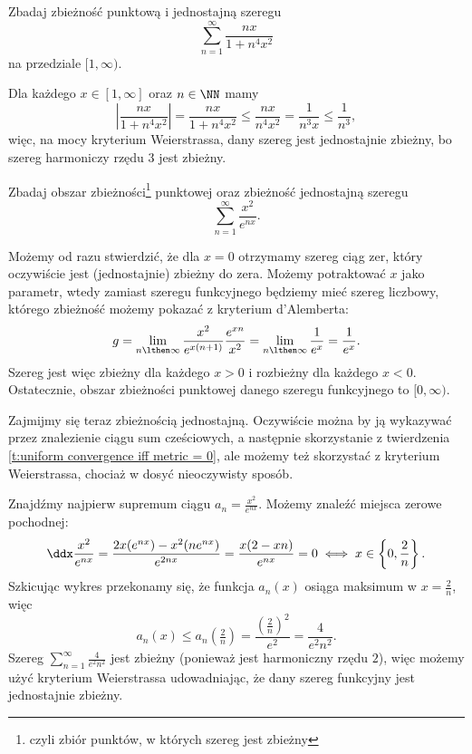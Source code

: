 \begin{example}
    Zbadaj zbieżność punktową i jednostajną szeregu
    \[ \sum_{n=1}^\infty \frac{nx}{1+n^4x^2} \]
    na przedziale $[1,\infty)$.
\end{example}
\begin{solution}
    Dla każdego $x \in [1, \infty]$ oraz $n \in \NN$ mamy
    \[ \left|\frac{nx}{1+n^4x^2}\right| = \frac{nx}{1+n^4x^2} \leq \frac{nx}{n^4x^2} = \frac{1}{n^3x} \leq \frac{1}{n^3}, \]
    więc, na mocy kryterium Weierstrassa, dany szereg jest jednostajnie zbieżny, bo szereg harmoniczy rzędu $3$ jest zbieżny.
\end{solution}

\begin{example}
    Zbadaj obszar zbieżności\footnote{czyli zbiór punktów, w których szereg jest zbieżny} punktowej oraz zbieżność jednostajną szeregu
    \[ \sum_{n=1}^\infty \frac{x^2}{e^{nx}}. \]
\end{example}
\begin{solution}
    Możemy od razu stwierdzić, że dla $x = 0$ otrzymamy szereg ciąg zer, który oczywiście jest (jednostajnie) zbieżny do zera. Możemy potraktować $x$ jako parametr, wtedy zamiast szeregu funkcyjnego będziemy mieć szereg liczbowy, którego zbieżność możemy pokazać z kryterium d'Alemberta:
    \[ g = \lim_{n\lthen\infty} \frac{x^2}{e^{x(n+1)}}\frac{e^{xn}}{x^2} = \lim_{n\lthen\infty}\frac{1}{e^x} = \frac{1}{e^x}. \]
    Szereg jest więc zbieżny dla każdego $x > 0$ i rozbieżny dla każdego $x < 0$. Ostatecznie, obszar zbieżności punktowej danego szeregu funkcyjnego to $[0,\infty)$.

    Zajmijmy się teraz zbieżnością jednostajną. Oczywiście można by ją wykazywać przez znalezienie ciągu sum cześciowych, a następnie skorzystanie z twierdzenia \ref{t:uniform convergence iff metric = 0}, ale możemy też skorzystać z kryterium Weierstrassa, chociaż w dosyć nieoczywisty sposób.

    Znajdźmy najpierw supremum ciągu $a_n = \frac{x^2}{e^{nx}}$. Możemy znaleźć miejsca zerowe pochodnej:
    \[ \ddx \frac{x^2}{e^{nx}} = \frac{2x(e^{nx}) - x^2(ne^{nx})}{e^{2nx}} = \frac{x(2 - xn)}{e^{nx}} = 0 \iff x \in \left\{0, \frac{2}{n}\right\}. \]
    Szkicując wykres przekonamy się, że funkcja $a_n(x)$ osiąga maksimum w $x = \frac{2}{n}$, więc
    \[ a_n(x) \leq a_n\left(\tfrac{2}{n}\right) = \frac{\left(\frac{2}{n}\right)^2}{e^2} = \frac{4}{e^2n^2}. \]
    Szereg $\sum_{n=1}^\infty \frac{4}{e^2n^2}$ jest zbieżny (ponieważ jest harmoniczny rzędu $2$), więc możemy użyć kryterium Weierstrassa udowadniając, że dany szereg funkcyjny jest jednostajnie zbieżny.
\end{solution}

